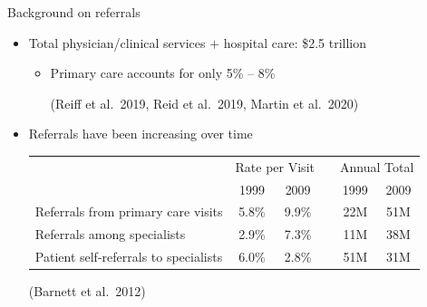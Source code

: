 \documentclass[slides, aspectratio=169]{beamer}
\newcommand{\bit}{\begin{itemize}}
\newcommand{\eit}{\end{itemize}}
\begin{document}
\begin{frame}[t]{Background on referrals}
\begin{itemize}

\bigskip

\item Total physician/clinical services $+$ hospital care: \$2.5 trillion
\bit
    \item Primary care accounts for only 5\% -- 8\%
    
    \parbox{\linewidth}{\footnotesize
    (Reiff et al.~2019, Reid et al.~2019, Martin et al.~2020)
    }
\eit
\bigskip \medskip \pause

\item Referrals have been increasing over time
\medskip

{\footnotesize
\begin{tabular}{lccccc}
\hline
    & \multicolumn{2}{c}{Rate per Visit} &   &  \multicolumn{2}{c}{Annual Total} \\
    &   1999    &   2009    &   &   1999    &   2009 \\
\hline
Referrals from primary care visits  &   5.8\%   &   9.9\%   &   &   22M &   51M \\
Referrals among specialists         &   2.9\%   &   7.3\%   &   &   11M &   38M \\
Patient self-referrals to specialists & 6.0\%   &   2.8\%   &   &   51M &   31M \\
\hline
\end{tabular}

\smallskip
(Barnett et al.~2012)
}

\end{itemize}
\end{frame}
\end{document}
